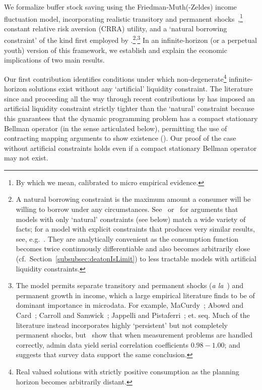 \documentclass[BufferStockTheory]{subfiles}
\begin{document}
We formalize buffer stock saving using the Friedman-Muth(-Zeldes) income fluctuation model, incorporating realistic transitory and permanent shocks~\citep{friedmanATheory, muthOptimal, zeldesStochastic},\footnote{By which we mean, calibrated to micro empirical evidence.}  constant relative risk aversion (CRRA) utility, and a `natural borrowing constraint' of the kind first employed by \cite{zeldesStochastic}.\footnote{A natural borrowing constraint is the maximum amount a consumer will be willing to borrow under any circumstances.
See~\cite{carrollBSLCPIH} or~\cite{gpLifeCycle} for arguments that models with only `natural' constraints (see below) match a wide variety of facts; for a model with explicit constraints that produces very similar results, see, e.g.~\cite{Cagetti}.
They are analytically convenient as the consumption function becomes twice continuously differentiable and also becomes arbitrarily close (cf.\ Section~\ref{subsubsec:deatonIsLimit}) to less tractable models with artificial liquidity constraints.}\textsuperscript{,}\footnote{The model permits separate transitory and permanent shocks (\textit{a la}~\cite{muthOptimal}) and permanent growth in income, which a large empirical literature finds to be of dominant importance in microdata.
For example, MaCurdy~\citeyearpar{macurdyTimeseries}; Abowd and Card~\citeyearpar{acCovariance}; Carroll and Samwick~\citeyearpar{csNature}; Jappelli and Pistaferri~\citeyear{jpCins}; et.
seq.
Much of the literature instead incorporates highly `persistent' but not completely permanent shocks, but~\cite{dhmImproving} show that when measurement problems are handled correctly, admin data yield serial correlation coefficients $0.98-1.00$; and~\cite{dmHowMuch} suggests that survey data support the same conclusion.}  In an infinite-horizon (or a \cite{blanchardFinite} perpetual youth) version of this framework, we establish and explain the economic implications of two main results.


Our first contribution identifies conditions under which non-degenerate\footnote{Real valued solutions with strictly positive consumption as the planning horizon becomes arbitrarily distant.} infinite-horizon solutions exist without any `artificial' liquidity constraint.
The literature since \cite{bewleyPIH} and proceeding all the way through recent contributions by \cite{mstIncFluct,maUnboundedDP} has imposed an artificial liquidity constraint strictly tighter than the `natural' constraint because this guarantees that the dynamic programming problem has a compact stationary Bellman operator (in the sense articulated below), permitting the use of contracting mapping arguments to show existence (\cite{stachurski2022}).
Our proof of the case without artificial constraints holds even if a compact stationary Bellman operator may not exist.
\end{document}
